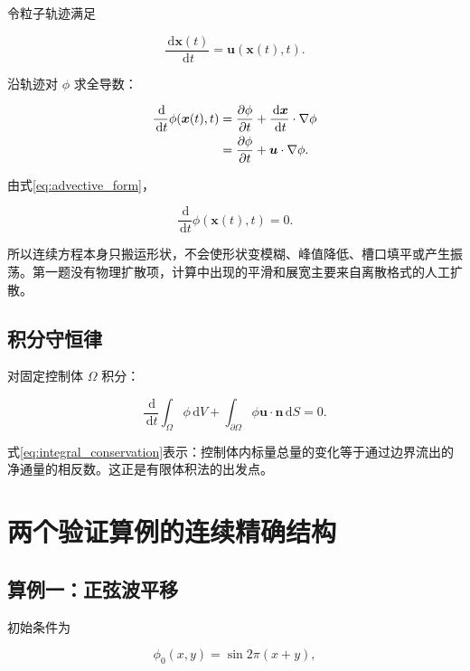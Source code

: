 \documentclass[UTF8,12pt,a4paper,fontset=fandol]{ctexart}
\numberwithin{equation}{section}
\newcommand{\dd}{\,\mathrm d}
\newcommand{\xf}{\bm x}
\begin{document}
令粒子轨迹满足

\begin{equation}
  \frac{\dd\xf(t)}{\dd t}
  =\bm u(\xf(t),t).
  \label{eq:characteristic}
\end{equation}

沿轨迹对 $\phi$ 求全导数：

\begin{align}
  \frac{\dd}{\dd t}\phi(\xf(t),t)
  &=
  \frac{\partial\phi}{\partial t}
  +\frac{\dd\xf}{\dd t}\cdot\nabla\phi \notag\\
  &=
  \frac{\partial\phi}{\partial t}
  +\bm u\cdot\nabla\phi.
\end{align}

由式\eqref{eq:advective_form}，

\begin{equation}
  \frac{\dd}{\dd t}\phi(\xf(t),t)=0.
\end{equation}

所以连续方程本身只搬运形状，不会使形状变模糊、峰值降低、槽口填平或产生振荡。第一题没有物理扩散项，计算中出现的平滑和展宽主要来自离散格式的人工扩散。

\subsection{积分守恒律}

对固定控制体 $\Omega$ 积分：

\begin{equation}
  \frac{\dd}{\dd t}
  \int_\Omega\phi\dd V
  +
  \int_{\partial\Omega}
  \phi\bm u\cdot\bm n\dd S
  =0.
  \label{eq:integral_conservation}
\end{equation}

式\eqref{eq:integral_conservation}表示：控制体内标量总量的变化等于通过边界流出的净通量的相反数。这正是有限体积法的出发点。

\section{两个验证算例的连续精确结构}

\subsection{算例一：正弦波平移}

初始条件为

\begin{equation}
  \phi_0(x,y)=\sin 2\pi(x+y),
\end{equation}
\end{document}
